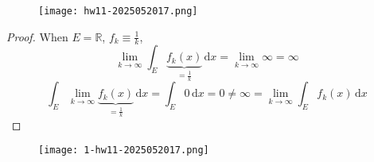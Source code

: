 \begin{exercise}
\begin{figure}[H]
\centering
\texttt{[image: hw11-2025052017.png]}
\label{}
\end{figure}
\end{exercise}
\begin{proof}
When $E=\mathbb{R}$, $f_k\equiv\frac{1}{k}$,
\[
\lim_{ k \to \infty } \int_{E}^{} \underbrace{ f_k(x) }_{ =\frac{1}{k} } \, \mathrm{d}x =\lim_{ k \to \infty } \infty=\infty
\]
\[
\int_{E}^{} \lim_{ k \to \infty } \underbrace{ f_k(x) }_{ =\frac{1}{k} } \, \mathrm{d}x =\int_{E}^{} 0 \, \mathrm{d}x =0\neq \infty= \lim_{ k \to \infty } \int_{E}^{} f_k(x) \, \mathrm{d}x 
\]
\end{proof}

\begin{exercise}
\begin{figure}[H]
\centering
\texttt{[image: 1-hw11-2025052017.png]}
\label{}
\end{figure}
\end{exercise}
